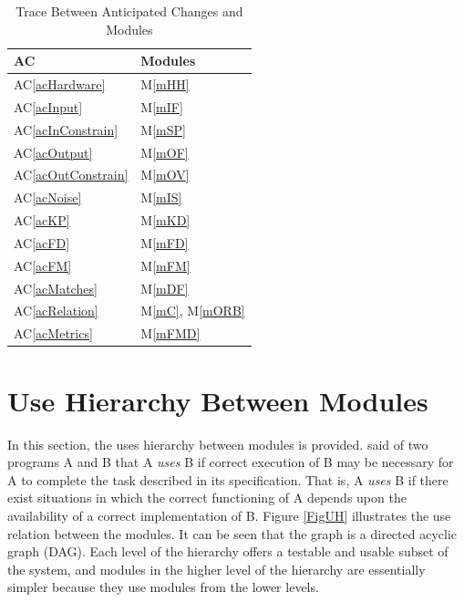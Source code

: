 \documentclass[12pt, titlepage]{article}
\newcommand{\acref}[1]{AC\ref{#1}}
\newcommand{\mref}[1]{M\ref{#1}}
\begin{document}
\begin{table}[H]
\centering
\begin{tabular}{p{} p{}}
\toprule
\textbf{AC} & \textbf{Modules}\\
\midrule
\acref{acHardware} & \mref{mHH}\\
\acref{acInput} & \mref{mIF}\\
\acref{acInConstrain} & \mref{mSP}\\
\acref{acOutput} & \mref{mOF}\\
\acref{acOutConstrain} & \mref{mOV}\\
\acref{acNoise} & \mref{mIS}\\
\acref{acKP} & \mref{mKD}\\
\acref{acFD} & \mref{mFD}\\
\acref{acFM} & \mref{mFM}\\
\acref{acMatches} & \mref{mDF}\\
\acref{acRelation} & \mref{mC}, \mref{mORB}\\
\acref{acMetrics} & \mref{mFMD}\\
\bottomrule
\end{tabular}
\caption{Trace Between Anticipated Changes and Modules}
\label{TblACT}
\end{table}

\section{Use Hierarchy Between Modules} \label{SecUse}

In this section, the uses hierarchy between modules is
provided. \citet{Parnas1978} said of two programs A and B that A {\em uses} B if
correct execution of B may be necessary for A to complete the task described in
its specification. That is, A {\em uses} B if there exist situations in which
the correct functioning of A depends upon the availability of a correct
implementation of B.  Figure \ref{FigUH} illustrates the use relation between
the modules. It can be seen that the graph is a directed acyclic graph
(DAG). Each level of the hierarchy offers a testable and usable subset of the
system, and modules in the higher level of the hierarchy are essentially simpler
because they use modules from the lower levels.

\end{document}
